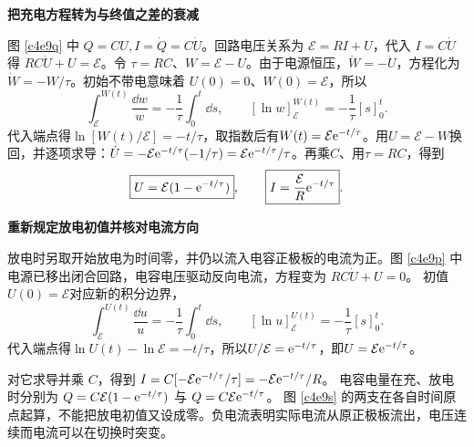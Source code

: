\begin{solution}\textbf{把充电方程转为与终值之差的衰减}\par\nobreak
图 \ref{c4e9q} 中 $Q=CU,I=\dot Q=C\dot U$。回路电压关系为
$\mathcal E=RI+U$，代入 $I=C\dot U$ 得 $RC\dot U+U=\mathcal E$。令 $\tau=RC$、$W=\mathcal E-U$。由于电源恒压，$\dot W=-\dot U$，方程化为 $\dot W=-W/\tau$。初始不带电意味着 $U(0)=0$、$W(0)=\mathcal E$，所以
\[
 \int_{\mathcal E}^{W(t)}\frac{\dd w}{w}
 =-\frac1\tau\int_0^t\dd s,
 \qquad[\ln w]_{\mathcal E}^{W(t)}=-\frac1\tau[s]_0^t.
\]
代入端点得$\ln[W(t)/\mathcal E]=-t/\tau$，取指数后有$W(t)=\mathcal E\mathrm e^{-t/\tau}$。用$U=\mathcal E-W$换回，并逐项求导：$\dot U=-\mathcal E\mathrm e^{-t/\tau}(-1/\tau)=\mathcal E\mathrm e^{-t/\tau}/\tau$。再乘$C$、用$\tau=RC$，得到
\[
 \boxed{U=\mathcal E(1-\mathrm e^{-t/\tau})},\qquad
 \boxed{I=\frac{\mathcal E}{R}\mathrm e^{-t/\tau}}.
\]



\par\medskip{}\noindent\textbf{重新规定放电初值并核对电流方向}\par\nobreak
放电时另取开始放电为时间零，并仍以流入电容正极板的电流为正。图 \ref{c4e9p} 中电源已移出闭合回路，电容电压驱动反向电流，方程变为 $RC\dot U+U=0$。
初值$U(0)=\mathcal E$对应新的积分边界，
\[
\int_{\mathcal E}^{U(t)}\frac{\dd u}{u}
=-\frac1\tau\int_0^t\dd s,
\qquad [\ln u]_{\mathcal E}^{U(t)}=-\frac1\tau[s]_0^t.
\]
代入端点得$\ln U(t)-\ln\mathcal E=-t/\tau$，所以$U/\mathcal E=\mathrm e^{-t/\tau}$，即$U=\mathcal E\mathrm e^{-t/\tau}$。

对它求导并乘 $C$，得到
$I=C[-\mathcal E\mathrm e^{-t/\tau}/\tau]=-\mathcal E\mathrm e^{-t/\tau}/R$。
电容电量在充、放电时分别为 $Q=C\mathcal E(1-\mathrm e^{-t/\tau})$ 与 $Q=C\mathcal E\mathrm e^{-t/\tau}$。
图 \ref{c4e9s} 的两支在各自时间原点起算，不能把放电初值又设成零。负电流表明实际电流从原正极板流出，电压连续而电流可以在切换时突变。
\end{solution}

